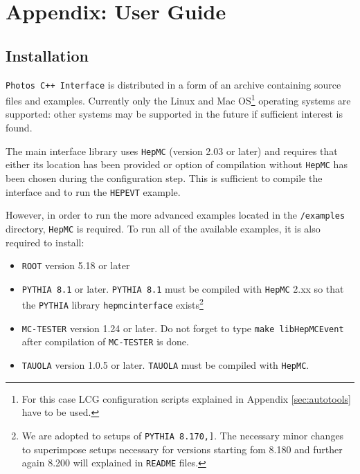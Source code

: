 \documentclass[]{Photos_interface_design}
\begin{document}
\section{Appendix: User Guide}
\label{sec:User Guide}

\subsection{Installation}
\label{sec:Installation}
 
{\tt Photos C++ Interface} is distributed in a form of an archive containing source files and examples.
Currently only the Linux and Mac OS\footnote{For this case LCG configuration 
scripts explained in Appendix \ref{sec:autotools} have to be used.} operating systems are supported: other systems may be
supported in the future if sufficient interest is found.

The main interface library uses {\tt HepMC} \cite{Dobbs:2001ck} (version 2.03 or later) and requires that either
its location has been provided or option of compilation without {\tt HepMC} has been chosen during the configuration step.
This is sufficient to compile the interface and to run the {\tt HEPEVT} example.

However, in order to run the more advanced examples located in the {\tt /examples} directory, {\tt HepMC} is required.
To run all of the available examples, it is also required to install:

\begin{itemize}
  \item {\tt ROOT} \cite{root-install-www} version 5.18 or later
  \item {\tt PYTHIA 8.1} \cite{Sjostrand:2007gs} or later. {\tt PYTHIA 8.1} must be compiled with {\tt HepMC} 2.xx
        so that the {\tt PYTHIA} library {\tt hepmcinterface} exists\footnote{
We are adopted to setups of {\tt PYTHIA 8.170,]}. 
              The necessary minor changes to superimpose setups necessary
 for  versions starting fom  8.180
 and further again 8.200 will explained in {\tt README} files.}
  \item {\tt MC-TESTER} \cite{Golonka:2002rz,Davidson:2008ma} version 1.24 or later.
        Do not forget to type {\tt make libHepMCEvent} after compilation of {\tt MC-TESTER} is done.
  \item {\tt TAUOLA} \cite{Davidson:2010rw} version 1.0.5 or later. {\tt TAUOLA} must be compiled with {\tt HepMC}.
\end{itemize}
\end{document}
